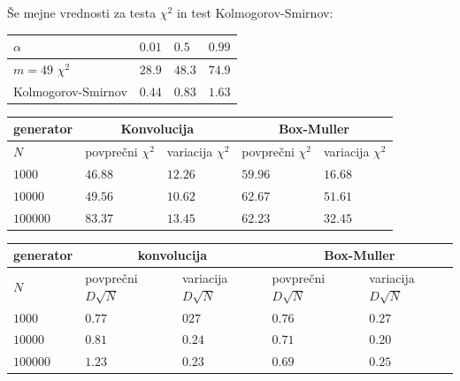 \documentclass[slovene,11pt,a4paper]{article}
\numberwithin{equation}{section} %
\numberwithin{figure}{section} %
\numberwithin{table}{section} %
\begin{document}
Še mejne vrednosti za testa $\chi^2$ in test Kolmogorov-Smirnov:



\begin{table}[!h]
\begin{center}
\begin{tabular}{|l|l|l|l|}
\hline
$\alpha$ & $0.01$ & $0.5$ & $0.99$ \\ \hline
$m=49$ $\chi^2$ & $28.9$ & $48.3$ & $74.9$ \\ \hline
Kolmogorov-Smirnov & $0.44$ & $0.83$ & $1.63$ \\ \hline
\end{tabular}
\end{center}
\end{table}

\begin{table}[!h]
\begin{center}
\begin{tabular}{|l|l|l|l|l|}
\hline
generator & \multicolumn{2}{c|}{Konvolucija} &  \multicolumn{2}{c|}{Box-Muller}  \\ \hline
$N$ & povprečni $\chi^2$ & variacija $\chi^2$ & povprečni $\chi^2$ & variacija $\chi^2$ \\  \hline
$1000$ & $46.88$ & $12.26$ & $59.96$ & $16.68$ \\ \hline
$10000$ & $49.56$ & $10.62$ & $62.67$ & $51.61$ \\ \hline
$100000$ & $83.37$ & $13.45$ & $62.23$ & $32.45$ \\ \hline
\end{tabular}
\end{center}
\end{table}



\begin{table}[!h]
\begin{center}
\begin{tabular}{|l|l|l|l|l|}
\hline
generator & \multicolumn{2}{c|}{konvolucija} &  \multicolumn{2}{c|}{Box-Muller}  \\ \hline
$N$ & povprečni $D\sqrt{N}$ & variacija $D\sqrt{N}$ & povprečni $D\sqrt{N}$ & variacija $D\sqrt{N}$ \\  \hline
$1000$ & $0.77$ & $027$ & $0.76$ & $0.27$ \\ \hline
$10000$ & $0.81$ & $0.24$ & $0.71$ & $0.20$ \\ \hline
$100000$ & $1.23$ & $0.23$ & $0.69$ & $0.25$ \\ \hline
\end{tabular}
\end{center}
\end{table}
\end{document}
